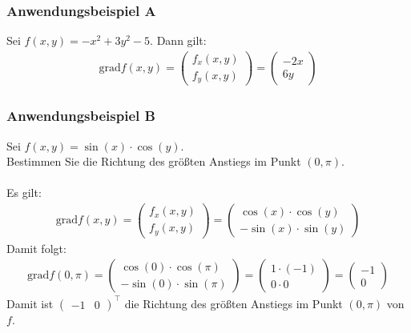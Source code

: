 \subsubsection*{Anwendungsbeispiel A}
Sei $f(x,y) = -x^2 + 3 y^2 -5$. Dann gilt:
\begin{align*}
\mathrm{grad} f(x,y) = 
\begin{pmatrix}
f_x(x,y)\\
f_y(x,y)
\end{pmatrix}
= 
\begin{pmatrix}
-2x\\
6 y
\end{pmatrix}
\end{align*}
\newpage
\subsubsection*{Anwendungsbeispiel B}
Sei $f(x,y) = \sin(x) \cdot \cos(y)$.\\
Bestimmen Sie die Richtung des größten Anstiegs im Punkt $(0,\pi)$.\\
\\
Es gilt:
\begin{align*}
\mathrm{grad} f(x,y) = 
\begin{pmatrix}
f_x(x,y)\\
f_y(x,y)
\end{pmatrix}
=
\begin{pmatrix}
\cos(x) \cdot \cos(y)\\
-\sin(x) \cdot \sin(y)
\end{pmatrix}
\end{align*} 
Damit folgt:
\begin{align*}
\mathrm{grad} f(0,\pi)
=
\begin{pmatrix}
\cos(0) \cdot \cos(\pi)\\
-\sin(0) \cdot \sin(\pi)
\end{pmatrix}
=\begin{pmatrix}
1 \cdot (-1)\\
0 \cdot 0
\end{pmatrix}
=
\begin{pmatrix}
-1\\
0
\end{pmatrix}
\end{align*}
Damit ist $\begin{pmatrix} -1 & 0\end{pmatrix}^\top$ die Richtung des größten Anstiegs im Punkt $(0, \pi)$ von $f$.\\

